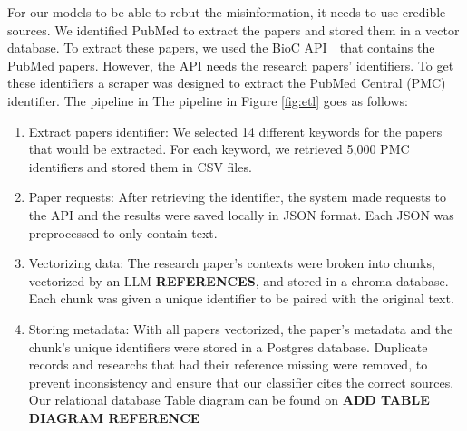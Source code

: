 For our models to be able to rebut the misinformation, it needs to use credible sources. We identified PubMed to extract the papers and stored them in a vector database.
To extract these papers, we used the BioC API \cite{bioinformatics} that contains the PubMed papers. However, the API needs the research papers' identifiers.
To get these identifiers a scraper was designed to extract the PubMed Central (PMC) identifier. The pipeline in The pipeline in Figure \ref{fig:etl} goes as follows:
\begin{enumerate}
	\item Extract papers identifier: We selected 14 different keywords for the papers that would be extracted. For each keyword, we retrieved 5,000 PMC identifiers and stored them in CSV files. 
	\item Paper requests: After retrieving the identifier, the system made requests to the API and the results were saved locally in JSON format. Each JSON was preprocessed to only contain text.
	\item Vectorizing data: The research paper's contexts were broken into chunks, vectorized by an LLM \textbf{REFERENCES}, and stored in a chroma database. Each chunk was given a unique identifier to be paired with the original text. 
	\item Storing metadata: With all papers vectorized, the paper's metadata and the chunk's unique identifiers were stored in a Postgres database. Duplicate records and researchs that had their reference missing were removed, to prevent
	inconsistency and ensure that our classifier cites the correct sources. Our relational database Table diagram can be found on \textbf{ADD TABLE DIAGRAM REFERENCE}




    


\end{enumerate}

